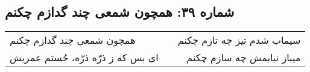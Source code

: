 \begin{center}
\section*{شماره ۳۹: همچون شمعی چند گدازم چکنم}
\label{sec:039}
\begin{longtable}{l p{0.5cm} r}
همچون شمعی چند گدازم چکنم
&&
سیماب شدم تیز چه تازم چکنم
\\
ای بس که ز ذرّه ذرّه، جُستم عمریش
&&
میباز نیابمش چه سازم چکنم
\\
\end{longtable}
\end{center}
